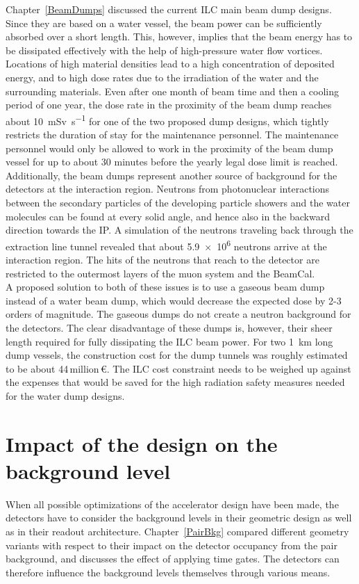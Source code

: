 Chapter~\ref{BeamDumps} discussed the current ILC main beam dump designs.
Since they are based on a water vessel, the beam power can be sufficiently absorbed over a short length.
This, however, implies that the beam energy has to be dissipated effectively with the help of high-pressure water flow vortices.
Locations of high material densities lead to a high concentration of deposited energy, and to high dose rates due to the irradiation of the water and the surrounding materials. 
Even after one month of beam time and then a cooling period of one year, the dose rate in the proximity of the beam dump reaches about \SI{10}{\milli\sievert\per\second} for one of the two proposed dump designs, which tightly restricts the duration of stay for the maintenance personnel.
The maintenance personnel would only be allowed to work in the proximity of the beam dump vessel for up to about 30 minutes before the yearly legal dose limit is reached.
Additionally, the beam dumps represent another source of background for the detectors at the interaction region.
Neutrons from photonuclear interactions between the secondary particles of the developing particle showers and the water molecules can be found at every solid angle, and hence also in the backward direction towards the IP.
A simulation of the neutrons traveling back through the extraction line tunnel revealed that about \num{5.9e6} neutrons arrive at the interaction region.
The hits of the neutrons that reach to the \sid detector are restricted to the outermost layers of the muon system and the BeamCal.
\\A proposed solution to both of these issues is to use a gaseous beam dump instead of a water beam dump, which would decrease the expected dose by 2-3 orders of magnitude.
The gaseous dumps do not create a neutron background for the detectors.
The clear disadvantage of these dumps is, however, their sheer length required for fully dissipating the ILC beam power.
For two \SI{1}{\kilo\meter} long dump vessels, the construction cost for the dump tunnels was roughly estimated to be about 44\,million\,\euro.
The ILC cost constraint needs to be weighed up against the expenses that would be saved for the high radiation safety measures needed for the water dump designs.

\section{Impact of the \sid design on the background level}

When all possible optimizations of the accelerator design have been made, the detectors have to consider the background levels in their geometric design as well as in their readout architecture.
Chapter~\ref{PairBkg} compared different \sid geometry variants with respect to their impact on the detector occupancy from the pair background, and discusses the effect of applying time gates.
The detectors can therefore influence the background levels themselves through various means.

